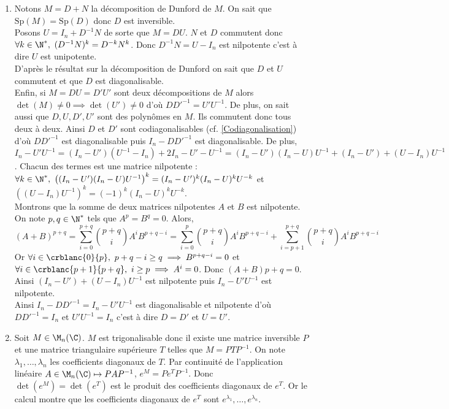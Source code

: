 \documentclass[8pt]{book}
\begin{document}
	\begin{enumerate}[leftmargin=*]
		\item Notons $M=D+N$ la décomposition de Dunford de $M$. On sait que $\text{Sp}(M)=\text{Sp}(D)$ donc $D$ est inversible.\\
		Posons $U=I_n+D^{-1}N$ de sorte que $M=DU$. $N$ et $D$ commutent donc $\forall k\in \N^*,\ (D^{-1}N)^k=D^{-k}N^k$. Donc $D^{-1}N=U-I_n$ est nilpotente c'est à dire $U$ est unipotente.\\
		D'après le résultat sur la décomposition de Dunford on sait que $D$ et $U$ commutent et que $D$ est diagonalisable.\\
		Enfin, si $M=DU=D'U'$ sont deux décompositions de $M$ alors $\det(M)\ne 0\implies \det(U')\ne 0$ d'où $D{D'}^{-1}=U'U^{-1}$. De plus, on sait aussi que $D,U,D',U'$ sont des polynômes en $M$. Ils commutent donc tous deux à deux. Ainsi $D$ et $D'$ sont codiagonalisables (cf. \ref{Codiagonalisation}) d'où $D{D'}^{-1}$ est diagonalisable puis $I_n-D{D'}^{-1}$ est diagonalisable. De plus, $I_n-U'U^{-1}=(I_n-U')(U^{-1}-I_n)+2I_n-U'-U^{-1}=(I_n-U')(I_n-U)U^{-1}+(I_n-U')+(U-I_n)U^{-1}$. Chacun des termes est une matrice nilpotente : $\forall k\in \N^*,\ \left((I_n-U')(I_n-U)U^{-1}\right)^k=(I_n-U')^k(I_n-U)^kU^{-k}$ et $\left((U-I_n)U^{-1}\right)^k=(-1)^k(I_n-U)^kU^{-k}$.\\
		Montrons que la somme de deux matrices nilpotentes $A$ et $B$ est nilpotente. On note $p,q\in \N^*$ tels que $A^p=B^q=0$. Alors,
		$$(A+B)^{p+q}=\sum_{i=0}^{p+q}\binom{p+q}{i}A^iB^{p+q-i}=\sum_{i=0}^{p}\binom{p+q}{i}A^iB^{p+q-i}+\sum_{i=p+1}^{p+q}\binom{p+q}{i}A^iB^{p+q-i}$$
		Or $\forall i\in \crblanc{0}{p},\ p+q-i\geq q\implies B^{p+q-i}=0$ et $\forall i\in \crblanc{p+1}{p+q},\ i\geq p\implies A^i=0$. Donc $(A+B){p+q}=0$.\\
		Ainsi $(I_n-U')+(U-I_n)U^{-1}$ est nilpotente puis $I_n-U'U^{-1}$ est nilpotente.\\
		Ainsi $I_n-D{D'}^{-1}=I_n-U'U^{-1}$ est diagonalisable et nilpotente d'où $D{D'}^{-1}=I_n$ et $U'U^{-1}=I_n$ c'est à dire $D=D'$ et $U=U'$.
		\item Soit $M\in \M_n(\C)$. $M$ est trigonalisable donc il existe une matrice inversible $P$ et une matrice triangulaire supérieure $T$ telles que $M=PTP^{-1}$. On note $\lambda_1,\dots,\lambda_n$ les coefficients diagonaux de $T$. Par continuité de l'application linéaire $A\in \M_n(\C)\mapsto PAP^{-1}$, $e^M=Pe^TP^{-1}$. Donc $\det(e^M)=\det(e^T)$ est le produit des coefficients diagonaux de $e^T$. Or le calcul montre que les coefficients diagonaux de $e^T$ sont $e^{\lambda_1},\dots,e^{\lambda_n}$.\\

\end{enumerate}
\end{document}
